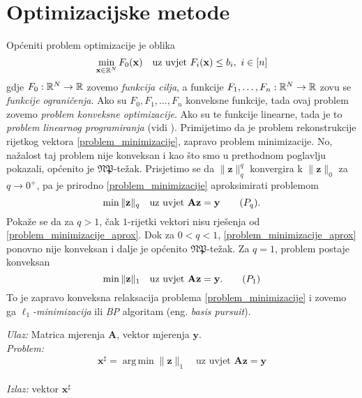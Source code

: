 \documentclass[a4paper,twoside,12pt]{memoir} %
\newcommand{\vect}[1]{\mathbf{#1}}
\renewcommand{\vec}{\vect}
\newcommand{\norm}[1]{\|{#1}\|}
\DeclareMathOperator*{\argmin}{arg\,min}
\newenvironment{alg}[1]
{
    \bigskip
    \begin{tcolorbox}[arc=0mm,boxrule=1.2pt,colframe=black,colback=white,detach title, before upper={\medskip\begin{center}\textbf{#1}\end{center}\hline\newline\medskip},frame hidden]
    \medskip
}
{
    \medskip
\end{tcolorbox}
    \bigskip
}
\begin{document}
\section[Optimizacijske metode][Optimizacijske metode]{Optimizacijske metode}
Op\'ceniti problem optimizacije je oblika
\begin{equation*}
    \min_{\vec x \in \R^N} F_0(\vec x)\quad\text{uz uvjet }F_i(\vec x) \leq b_i,\ i \in [n]
\end{equation*}
gdje $F_0:\mathbb{R}^N \rightarrow \mathbb{R}$ zovemo \textit{funkcija cilja}, a funkcije $F_1, \dots, F_n: \mathbb{R}^N \rightarrow \mathbb{R}$ zovu se \textit{funkcije ograni\v{c}enja}. Ako su $F_0, F_1, \dots, F_n$ konveksne funkcije, tada ovaj problem zovemo \textit{problem konveksne optimizacije}. Ako su te funkcije linearne, tada je to \textit{problem linearnog programiranja} (vidi \cite{chong2013introduction}). Primijetimo da je problem rekonstrukcije rijetkog vektora \eqref{problem_minimizacije}, zapravo problem minimizacije. No, na\v{z}alost taj problem nije konveksan i kao \v{s}to smo u prethodnom poglavlju pokazali, op\'cenito je $\mathfrak{NP}$-te\v{z}ak. Prisjetimo se da $\norm{\vec z}_q^q$ konvergira k $\norm{\vec z}_0$ za $q \rightarrow 0^+$, pa je prirodno  \eqref{problem_minimizacije} aproksimirati problemom
\begin{equation}
    \min \norm{\vec z}_q\quad\text{uz uvjet }\vec{Az}=\vec y\tag{$P_{q}$}\label{problem_minimizacije_aprox}.
\end{equation}
Poka\v{z}e se da za $q > 1$, \v{c}ak $1$-rijetki vektori nisu rje\v{s}enja od \eqref{problem_minimizacije_aprox}. Dok za $0 < q < 1$, \eqref{problem_minimizacije_aprox} ponovno nije konveksan i dalje je op\'cenito $\mathfrak{NP}$-te\v{z}ak. Za $q=1$, problem postaje konveksan
\begin{equation}
    \min \norm{\vec z}_1 \quad \text{uz uvjet }\vec{Az}=\vec y.\tag{$P_{1}$}\label{problem_minimizacije_l1}
\end{equation}
To je zapravo konveksna relaksacija problema \eqref{problem_minimizacije} i zovemo ga $\ell_1$\textit{-minimizacija} ili \textit{BP} algoritam (eng. \textit{basis pursuit}).

\begin{alg}{$\ell_1$-minimizacija (BP)}
    \textit{Ulaz:} Matrica mjerenja $\vec A$, vektor mjerenja $\vec y$. \\
    \textit{Problem:}
        \begin{equation}
            \vec x^{\sharp} = \argmin \norm{\vec z}_1 \quad \text{uz uvjet }\vec{Az}=\vec y\tag{$\ell_1-min$}\label{algoritam_l1_minimizacija}
        \end{equation} \\
        \textit{Izlaz:} vektor $\vec x^{\sharp}$
\end{alg}
\end{document}
